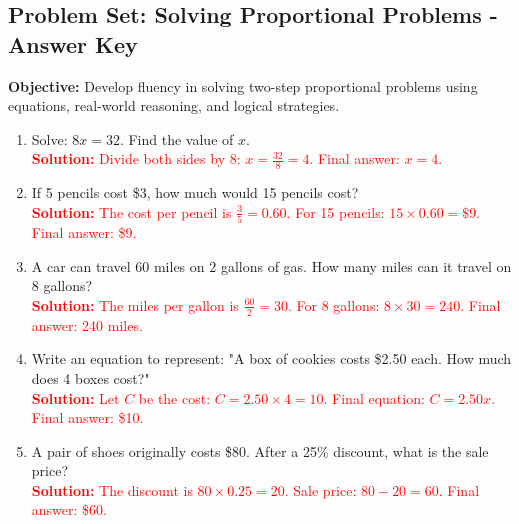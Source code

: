 \documentclass[10pt]{article}
\title{}
\date{}
\begin{document}
\subsection*{Problem Set: Solving Proportional Problems - Answer Key}
\onehalfspacing

\begin{tcolorbox}[colframe=black!40, colback=gray!5, 
coltitle=black, colbacktitle=black!20, fonttitle=\bfseries\Large, 
title=Learning Objective, halign title=center, left=5pt, right=5pt, top=5pt, bottom=15pt]
\textbf{Objective:} Develop fluency in solving two-step proportional problems using equations, real-world reasoning, and logical strategies.
\end{tcolorbox}

\begin{tcolorbox}[colframe=black!60, colback=white, 
coltitle=black, colbacktitle=black!15, fonttitle=\bfseries\Large, 
title=Exercises, halign title=center, left=10pt, right=10pt, top=10pt, bottom=20pt]
\begin{enumerate}[itemsep=2em]
    \item Solve: \(8x = 32\). Find the value of \(x\).\\
    \textcolor{red}{\textbf{Solution:} Divide both sides by 8: \(x = \frac{32}{8} = 4\). Final answer: \(x = 4\).}

    \item If 5 pencils cost \$3, how much would 15 pencils cost?\\
    \textcolor{red}{\textbf{Solution:} The cost per pencil is \(\frac{3}{5} = 0.60\). For 15 pencils: \(15 \times 0.60 = \$9\). Final answer: \$9.}

    \item A car can travel 60 miles on 2 gallons of gas. How many miles can it travel on 8 gallons?\\
    \textcolor{red}{\textbf{Solution:} The miles per gallon is \( \frac{60}{2} = 30\). For 8 gallons: \(8 \times 30 = 240\). Final answer: 240 miles.}

    \item Write an equation to represent: "A box of cookies costs \$2.50 each. How much does 4 boxes cost?"\\
    \textcolor{red}{\textbf{Solution:} Let \(C\) be the cost: \(C = 2.50 \times 4 = 10\). Final equation: \(C = 2.50x\). Final answer: \$10.}

    \item A pair of shoes originally costs \$80. After a 25\% discount, what is the sale price?\\
    \textcolor{red}{\textbf{Solution:} The discount is \(80 \times 0.25 = 20\). Sale price: \(80 - 20 = 60\). Final answer: \$60.}


\end{enumerate}
\end{tcolorbox}
\end{document}
